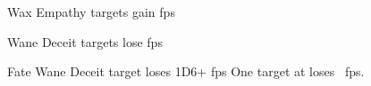 
  {\mFate}%
  {Wax}%
  {\duplicated}%
  {Empathy}%
  {\spellArea{} targets gain  \glspl{fp}}%
  {}

  {\mFate}%
  {Wane}%
  {\duplicated}%
  {Deceit}%
  {\spellArea{} targets lose  \glspl{fp}}%
  {}

  {Fate}%
  {Wane}%
  {\distant}%
  {Deceit}%
  {target loses 1D6+ \glspl{fp}}%
  {
    One target at \spellRange{} loses ~\glspl{fp}.
  }

